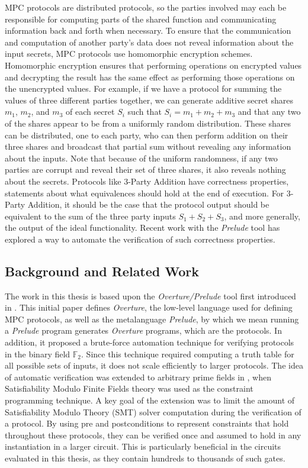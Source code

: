 \documentclass{article}
\begin{document}
MPC protocols are distributed protocols, so the parties involved may each be responsible for computing parts of the shared function and communicating information back and forth when necessary. To ensure that the communication and computation of another party's data does not reveal information about the input secrets, MPC protocols use homomorphic encryption schemes. Homomorphic encryption ensures that performing operations on encrypted values and decrypting the result has the same effect as performing those operations on the unencrypted values. For example, if we have a protocol for summing the values of three different parties together, we can generate additive secret shares $m_1$, $m_2$, and $m_3$ of each secret $S_i$ such that $S_i = m_1 + m_2 + m_3$ and that any two of the shares appear to be from a uniformly random distribution. These shares can be distributed, one to each party, who can then perform addition on their three shares and broadcast that partial sum without revealing any information about the inputs. Note that because of the uniform randomness, if any two parties are corrupt and reveal their set of three shares, it also reveals nothing about the secrets. Protocols like 3-Party Addition have correctness properties, statements about what equivalences should hold at the end of execution. For 3-Party Addition, it should be the case that the protocol output should be equivalent to the sum of the three party inputs $S_1 + S_2 + S_3$, and more generally, the output of the ideal functionality. Recent work with the \textit{Prelude} tool has explored a way to automate the verification of such correctness properties. 
\subsection{Background and Related Work}
The work in this thesis is based upon the \textit{Overture/Prelude} tool first introduced in \cite{skalka-near-ppdp24}. This initial paper defines \textit{Overture}, the low-level language used for defining MPC protocols, as well as the metalanguage \textit{Prelude}, by which we mean running a \textit{Prelude} program generates \textit{Overture} programs, which are the protocols. In addition, it proposed a brute-force automation technique for verifying protocols in the binary field $\mathbb{F}_2$. Since this technique required computing a truth table for all possible sets of inputs, it does not scale efficiently to larger protocols. The idea of automatic verification was extended to arbitrary prime fields in \cite{skalka-near-esop25}, when Satisfiability Modulo Finite Fields theory was used as the constraint programming technique. A key goal of the extension was to limit the amount of Satisfiability Modulo Theory (SMT) solver computation during the verification of a protocol. By using pre and postconditions to represent constraints that hold throughout these protocols, they can be verified once and assumed to hold in any instantiation in a larger circuit. This is particularly beneficial in the circuits evaluated in this thesis, as they contain hundreds to thousands of such gates. 
\end{document}
